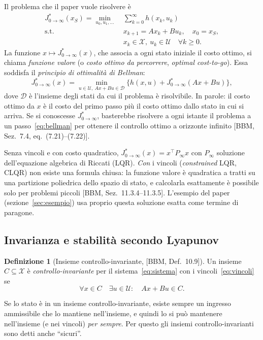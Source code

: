 \documentclass[11pt,a4paper]{article}
\theoremstyle{definition}
\newtheorem{definizione}{Definizione}[section]
\theoremstyle{plain}
\theoremstyle{remark}
\newcommand{\Xc}{\mathcal{X}}
\newcommand{\Uc}{\mathcal{U}}
\newcommand{\Jstar}{J^{*}_{0\to\infty}}
\newcommand{\libro}[1]{\textup{[BBM, #1]}} %
\begin{document}
Il problema che il paper vuole risolvere è
\begin{equation}\label{eq:ottimo-infinito}
\begin{aligned}
  \Jstar(x_S) = \min_{u_0,u_1,\dots}\ & \sum_{k=0}^{\infty} h(x_k,u_k)\\
  \text{s.t. }\ & x_{k+1} = Ax_k + Bu_k,\quad x_0 = x_S,\\
  & x_k\in\Xc,\ u_k\in\Uc\quad \forall k\ge 0.
\end{aligned}
\end{equation}
La funzione $x\mapsto\Jstar(x)$, che associa a ogni stato iniziale il costo
ottimo, si chiama \emph{funzione valore} (o \emph{costo ottimo da percorrere},
\emph{optimal cost-to-go}). Essa soddisfa il \emph{principio di ottimalità di
Bellman}:
\begin{equation}\label{eq:bellman}
  \Jstar(x) = \min_{u\in\Uc,\ Ax+Bu\in\mathcal{D}}
  \Big\{ h(x,u) + \Jstar(Ax+Bu)\Big\},
\end{equation}
dove $\mathcal{D}$ è l'insieme degli stati da cui il problema è risolvibile.
In parole: il costo ottimo da $x$ è il costo del primo passo più il costo
ottimo dallo stato in cui si arriva. Se si conoscesse $\Jstar$, basterebbe
risolvere a ogni istante il problema a un passo~\eqref{eq:bellman} per ottenere
il controllo ottimo a orizzonte infinito \libro{Sez.~7.4, eq.~(7.21)--(7.22)}.

Senza vincoli e con costo quadratico, $\Jstar(x)=x^\top P_\infty x$ con
$P_\infty$ soluzione dell'equazione algebrica di Riccati (LQR). \emph{Con} i
vincoli (\emph{constrained} LQR, CLQR) non esiste una formula chiusa: la
funzione valore è quadratica a tratti su una partizione poliedrica dello
spazio di stato, e calcolarla esattamente è possibile solo per problemi
piccoli \libro{Sez.~11.3.4--11.3.5}. L'esempio del paper (sezione~\ref{sec:esempio})
usa proprio questa soluzione esatta come termine di paragone.

\subsection{Invarianza e stabilità secondo Lyapunov}\label{sec:lyapunov}

\begin{definizione}[Insieme controllo-invariante, \libro{Def.~10.9}]\label{def:invariante}
Un insieme $C\subseteq\Xc$ è \emph{controllo-invariante} per il
sistema~\eqref{eq:sistema} con i vincoli~\eqref{eq:vincoli} se
\[
  \forall x\in C\quad \exists u\in\Uc:\quad Ax+Bu\in C.
\]
\end{definizione}
Se lo stato è in un insieme controllo-invariante, esiste sempre un ingresso
ammissibile che lo mantiene nell'insieme, e quindi lo si può mantenere
nell'insieme (e nei vincoli) \emph{per sempre}. Per questo gli insiemi
controllo-invarianti sono detti anche ``sicuri''.
\end{document}
